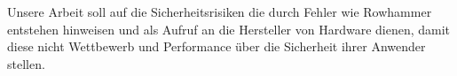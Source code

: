 \begin{otherlanguage}{ngerman}
Unsere Arbeit soll auf die Sicherheitsrisiken die durch Fehler wie Rowhammer
entstehen hinweisen und als Aufruf an die Hersteller von Hardware dienen, damit
diese nicht Wettbewerb und Performance über die Sicherheit ihrer Anwender
stellen.

\end{otherlanguage}

